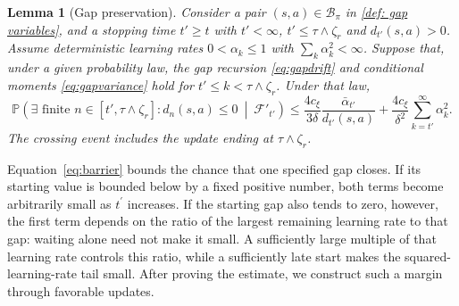 \documentclass[twoside,11pt]{article}
\newtheorem{lemma}[lemma]{Lemma}
\DeclareRobustCommand{\reviewbarstart}{%
  \ifhmode %
    \vadjust{\vbox to 0pt{%
      \vskip-\ht\strutbox %
      \vskip-\dp\strutbox %
      \cbstart[\changebarwidth] %
      \vss %
    }}%
  \else %
    \cbstart[\changebarwidth]%
  \fi %
} %
\providecommand{\DIFadd}[1]{#1} %
\providecommand{\DIFaddbegin}{\reviewbarstart} %
\providecommand{\DIFaddend}{\protect\cbend} %
\def\DIFadd#1{#1}%
\def\DIFaddbegin{}%
\def\DIFaddend{}%
\begin{document}
 \DIFaddbegin \begin{lemma}[Gap preservation]
\label{lem:barrier}
\DIFadd{Consider a pair $(s,a)\in\mathcal B_\pi$ }\DIFaddend in \autoref{def: gap variables}, and  \DIFaddbegin \DIFadd{a stopping time $t'\ge t$ with $t'<\infty$, $t'\le\tau\wedge\zeta_r$ and $d_{t'}(s,a)>0$.
Assume deterministic learning rates $0<\alpha_k\le1$ with $\sum_k\alpha_k^2<\infty$. Suppose that, under a given probability law, the gap recursion \eqref{eq:gapdrift} and conditional moments \eqref{eq:gapvariance} hold for $t'\le k<\tau\wedge\zeta_r$. Under that law,
}\begin{equation}
\DIFadd{\label{eq:barrier}
\mathbb P\!\left(\exists\text{ finite }n\in[t',\tau\wedge\zeta_r]:d_n(s,a)\le0\ \middle|\ \mathcal F'_{t'}\right)
\le \frac{4c_\xi}{3\delta}\frac{\bar\alpha_{t'}}{d_{t'}(s,a)}
+\frac{4c_\xi}{\delta^2}\sum_{k=t'}^\infty\alpha_k^2.
}\end{equation}\DIFaddend 
 \DIFaddbegin \DIFadd{The crossing event includes the update ending at $\tau\wedge\zeta_r$.
}\end{lemma}
\DIFadd{Equation~\eqref{eq:barrier} bounds the chance that one specified gap closes. If its starting value is bounded below by a fixed positive number, both terms become arbitrarily small as $t^{\prime}$ increases. If the starting gap also tends to zero, however, the first term depends on the ratio of the largest remaining learning rate to that gap: waiting alone need not make it small. A sufficiently large multiple of that learning rate controls this ratio, while a sufficiently late start makes the squared-learning-rate tail small. After proving the estimate, we construct such a margin through favorable updates.
}\DIFaddend 
\end{document}
